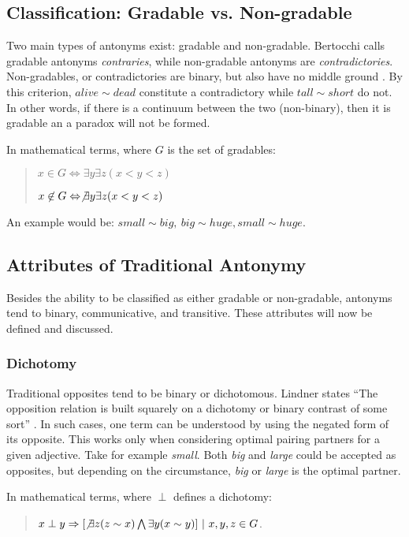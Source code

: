 \subsection {Classification: Gradable vs. Non-gradable}
\label{classification}
Two main types of antonyms exist: gradable and non-gradable. Bertocchi calls gradable antonyms \textit{contraries}, while non-gradable antonyms are \textit{contradictories}.   Non-gradables, or contradictories are binary, but also have no middle ground \cite{Bertocchi}.  By this criterion, $alive\sim dead$ constitute a contradictory while $tall\sim short$ do not.  In other words, if there is a continuum between the two (non-binary), then it is gradable an a paradox will not be formed. 

In mathematical terms, where $G$ is the set of gradables:
	\begin{quote}
		$x \in G\Leftrightarrow \exists y\exists z(x<y<z)$

		$x \not\in G\Leftrightarrow \not\exists y\exists z(x<y<z)$
	\end{quote}

An example would be: $small\sim big, ~big\sim huge, small\sim huge$.


\subsection {Attributes of Traditional Antonymy} 
Besides the ability to be classified as either gradable or non-gradable, antonyms tend to binary, communicative, and transitive. These attributes will now be defined and discussed.  

\subsubsection {Dichotomy} 
Traditional opposites tend to be binary or dichotomous.  Lindner states ``The opposition relation is built squarely on a dichotomy or binary contrast of some sort'' \cite{UpDown}. In such cases, one term can be understood by using the negated form of its opposite.  This works only when considering optimal pairing partners for a given adjective.  Take for example \textit{small}.  Both \textit{big} and \textit{large} could be accepted as opposites, but depending on the circumstance, \textit{big} or \textit{large} is the optimal partner.

In mathematical terms, where $\perp$ defines a dichotomy: 
	\begin{quote}
		$x \perp y \Rightarrow [\not\exists z(z \sim x) \bigwedge \exists y(x \sim y)]~|~x,y,z\in G$.
	\end{quote}

